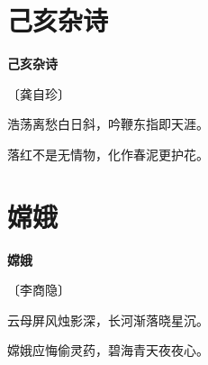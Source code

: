 \documentclass[12pt,UTF-8,openany,fontset=none]{ctexbook}
\begin{document}
\vspace{8pt}
\clearpage

\section{己亥杂诗}


\begin{center}
    {\bfseries 己亥杂诗}

    \vspace{18pt}

    \begin{large}\xuwen
        〔龚自珍〕
    \end{large}

\end{center}

    \vspace{18pt}  %

\begin{center}
    \begin{Large}

        浩荡离愁白日斜，吟鞭东指即天涯。

        落红不是无情物，化作春泥更护花。

    \end{Large}

\end{center}

\vspace{8pt}
\clearpage

\section{嫦娥}


\begin{center}
    {\bfseries 嫦娥}

    \vspace{18pt}

    \begin{large}\xuwen
        〔李商隐〕
    \end{large}

\end{center}

    \vspace{18pt}  %

\begin{center}
    \begin{Large}

        云母屏风烛影深，长河渐落晓星沉。

        嫦娥应悔偷灵药，碧海青天夜夜心。

    \end{Large}

\end{center}
\end{document}
